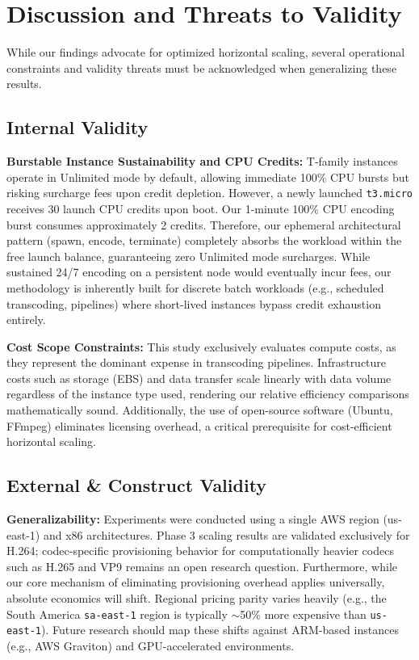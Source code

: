 \documentclass[conference]{IEEEtran}
\begin{document}
\section{Discussion and Threats to Validity}
\label{limitations}

While our findings advocate for optimized horizontal scaling, several operational constraints and validity threats must be acknowledged when generalizing these results.

\subsection{Internal Validity}
\textbf{Burstable Instance Sustainability and CPU Credits:} T-family instances operate in Unlimited mode by default, allowing immediate 100\% CPU bursts but risking surcharge fees upon credit depletion. However, a newly launched \texttt{t3.micro} receives 30 launch CPU credits upon boot. Our 1-minute 100\% CPU encoding burst consumes approximately 2 credits. Therefore, our ephemeral architectural pattern (spawn, encode, terminate) completely absorbs the workload within the free launch balance, guaranteeing zero Unlimited mode surcharges. While sustained 24/7 encoding on a persistent node would eventually incur fees, our methodology is inherently built for discrete batch workloads (e.g., scheduled transcoding, pipelines) where short-lived instances bypass credit exhaustion entirely.

\textbf{Cost Scope Constraints:} This study exclusively evaluates compute costs, as they represent the dominant expense in transcoding pipelines. Infrastructure costs such as storage (EBS) and data transfer scale linearly with data volume regardless of the instance type used, rendering our relative efficiency comparisons mathematically sound. Additionally, the use of open-source software (Ubuntu, FFmpeg) eliminates licensing overhead, a critical prerequisite for cost-efficient horizontal scaling.

\subsection{External \& Construct Validity}
\textbf{Generalizability:} Experiments were conducted using a single AWS region (us-east-1) and x86 architectures. Phase 3 scaling results are validated exclusively for H.264; codec-specific provisioning behavior for computationally heavier codecs such as H.265 and VP9 remains an open research question. Furthermore, while our core mechanism of eliminating provisioning overhead applies universally, absolute economics will shift. Regional pricing parity varies heavily (e.g., the South America \texttt{sa-east-1} region is typically $\sim$50\% more expensive than \texttt{us-east-1}). Future research should map these shifts against ARM-based instances (e.g., AWS Graviton) and GPU-accelerated environments.
\end{document}
